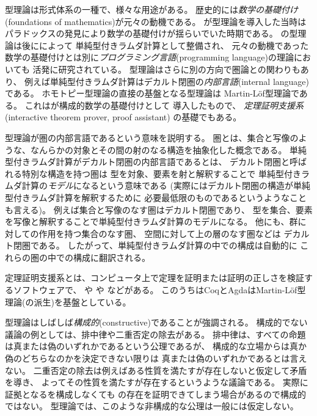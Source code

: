 \documentclass[index]{subfiles}
\begin{document}

型理論は形式体系の一種で、様々な用途がある。
歴史的には\emph{数学の基礎付け}(foundations of mathematics)が元々の動機である。
が型理論を導入した当時は
パラドックスの発見により数学の基礎付けが揺らいでいた時期である。
の型理論は後にによって
単純型付きラムダ計算として整備され、
元々の動機であった数学の基礎付けとは別に\emph{プログラミング言語}(programming language)の理論においても
活発に研究されている。
型理論はさらに別の方向で圏論との関わりもあり、
例えば単純型付きラムダ計算はデカルト閉圏の\emph{内部言語}(internal language)
である。
ホモトピー型理論の直接の基盤となる型理論は
Martin-Löf型理論である。
これはが構成的数学の基礎付けとして
導入したもので、
\emph{定理証明支援系}(interactive theorem prover, proof assistant)
の基礎でもある。

型理論が圏の内部言語であるという意味を説明する。
圏とは、集合と写像のような、なんらかの対象とその間の射のなる構造を抽象化した概念である。
単純型付きラムダ計算がデカルト閉圏の内部言語であるとは、
デカルト閉圏と呼ばれる特別な構造を持つ圏は
型を対象、要素を射と解釈することで
単純型付きラムダ計算の\emph{モデル}になるという意味である
(実際にはデカルト閉圏の構造が単純型付きラムダ計算を解釈するために
必要最低限のものであるというようなことも言える)。
例えば集合と写像のなす圏はデカルト閉圏であり、
型を集合、要素を写像と解釈することで単純型付きラムダ計算のモデルになる。
他にも、群に対しての作用を持つ集合のなす圏、
空間に対して上の層のなす圏などは
デカルト閉圏である。
したがって、単純型付きラムダ計算の中での構成は自動的に
これらの圏の中での構成に翻訳される。

定理証明支援系とは、コンピュータ上で定理を証明または証明の正しさを検証するソフトウェアで、
や
や
などがある。
このうちはCoqとAgdaはMartin-Löf型理論(の派生)を基盤としている。

型理論はしばしば\emph{構成的}(constructive)であることが強調される。
構成的でない議論の例としては、排中律や二重否定の除去がある。
排中律は、すべての命題は真または偽のいずれかであるという公理であるが、
構成的な立場からは真か偽のどちらなのかを決定できない限りは
真または偽のいずれかであるとは言えない。
二重否定の除去は例えばある性質を満たすが存在しないと仮定して矛盾を導き、
よってその性質を満たすが存在するというような議論である。
実際に証拠となるを構成しなくても
の存在を証明できてしまう場合があるので構成的ではない。
型理論では、このような非構成的な公理は一般には仮定しない。
\end{document}
